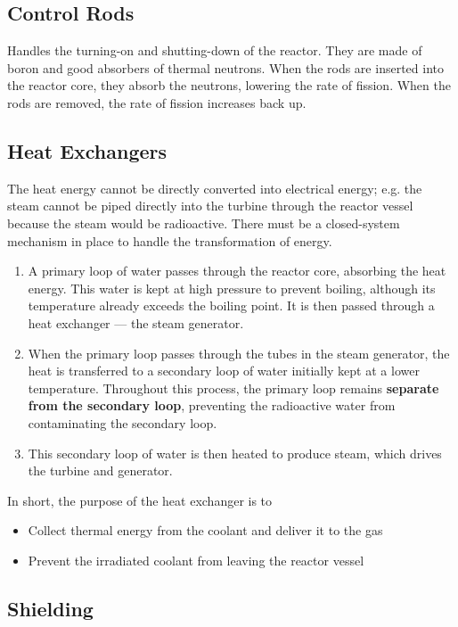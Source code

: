 \documentclass[a4paper,12pt]{article}
\begin{document}
\subsection{Control Rods}

Handles the turning-on and shutting-down of the reactor. They are made of boron and good absorbers of thermal neutrons. When the rods are inserted into the reactor core, they absorb the neutrons, lowering the rate of fission. When the rods are removed, the rate of fission increases back up.

\subsection{Heat Exchangers}

The heat energy cannot be directly converted into electrical energy; e.g. the steam cannot be piped directly into the turbine through the reactor vessel because the steam would be radioactive. There must be a closed-system mechanism in place to handle the transformation of energy.
\begin{enumerate}
  \item A primary loop of water passes through the reactor core, absorbing the heat energy. This water is kept at high pressure to prevent boiling, although its temperature already exceeds the boiling point. It is then passed through a heat exchanger --- the steam generator.
  \item When the primary loop passes through the tubes in the steam generator, the heat is transferred to a secondary loop of water initially kept at a lower temperature. Throughout this process, the primary loop remains \textbf{separate from the secondary loop}, preventing the radioactive water from contaminating the secondary loop.
  \item This secondary loop of water is then heated to produce steam, which drives the turbine and generator.
\end{enumerate}
In short, the purpose of the heat exchanger is to
\begin{itemize}
  \item Collect thermal energy from the coolant and deliver it to the gas
  \item Prevent the irradiated coolant from leaving the reactor vessel
\end{itemize}

\pagebreak

\subsection{Shielding}
\end{document}
